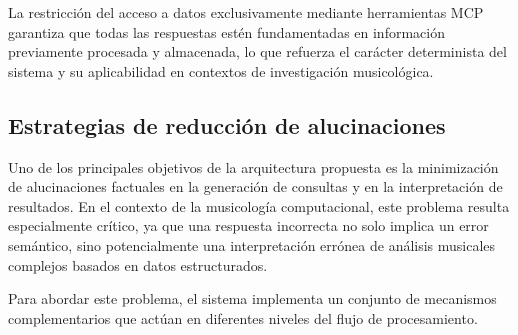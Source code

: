 La restricción del acceso a datos exclusivamente mediante herramientas MCP garantiza que todas las respuestas estén fundamentadas en información previamente procesada y almacenada, lo que refuerza el carácter determinista del sistema y su aplicabilidad en contextos de investigación musicológica.

\subsection{Estrategias de reducción de alucinaciones}
Uno de los principales objetivos de la arquitectura propuesta es la minimización de alucinaciones factuales en la generación de consultas y en la interpretación de resultados. En el contexto de la musicología computacional, este problema resulta especialmente crítico, ya que una respuesta incorrecta no solo implica un error semántico, sino potencialmente una interpretación errónea de análisis musicales complejos basados en datos estructurados.

Para abordar este problema, el sistema implementa un conjunto de mecanismos complementarios que actúan en diferentes niveles del flujo de procesamiento.

